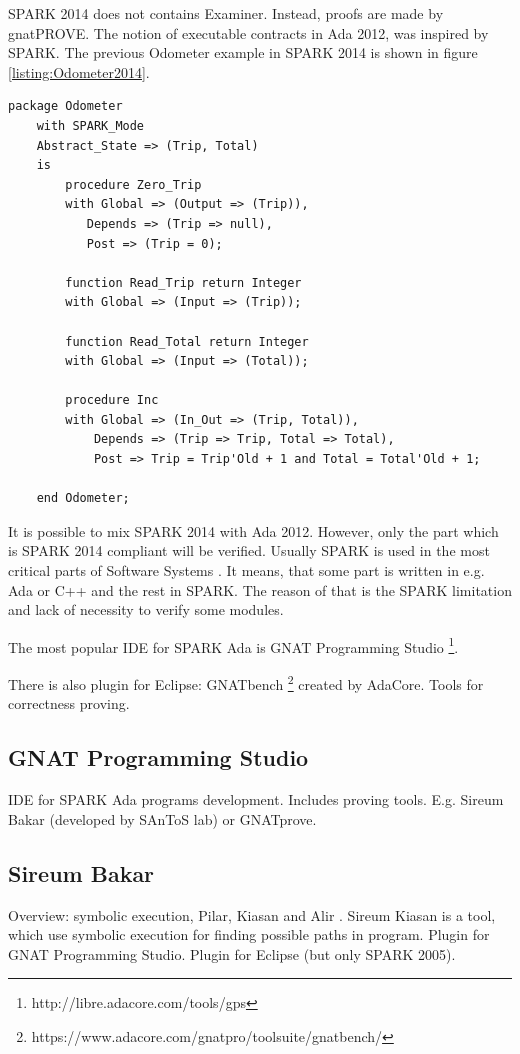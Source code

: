 SPARK 2014 does not contains Examiner. Instead, proofs are made by gnatPROVE.
The notion of executable contracts in Ada 2012, was inspired by SPARK. The previous Odometer example in SPARK 2014 is shown in figure \ref{listing:Odometer2014}.

\begin{lstlisting}[language=ada2012, frame=single, gobble=0, caption={SPARK 2014 code: Odometer}, label={listing:Odometer2014}]
	package Odometer
	with SPARK_Mode
	Abstract_State => (Trip, Total)
	is
		procedure Zero_Trip
		with Global => (Output => (Trip)),
		   Depends => (Trip => null),
		   Post => (Trip = 0);

		function Read_Trip return Integer
		with Global => (Input => (Trip));

		function Read_Total return Integer
		with Global => (Input => (Total));

		procedure Inc	   
		with Global => (In_Out => (Trip, Total)),
			Depends => (Trip => Trip, Total => Total),
			Post => Trip = Trip'Old + 1 and Total = Total'Old + 1;

	end Odometer;
\end{lstlisting} 

It is possible to mix SPARK 2014 with Ada 2012. However, only the part which is SPARK 2014 compliant will be verified. Usually SPARK is used in the most critical parts of Software Systems \cite{Spark:IndustrialExp}. It means, that some part is written in e.g. Ada or C++ and the rest in SPARK. The reason of that is the SPARK limitation and lack of necessity to verify some modules.

The most popular IDE for SPARK Ada is GNAT Programming Studio \footnote{http://libre.adacore.com/tools/gps}.

There is also plugin for Eclipse: GNATbench \footnote{https://www.adacore.com/gnatpro/toolsuite/gnatbench/} created by AdaCore. 
Tools for correctness proving.

\subsection{GNAT Programming Studio}
\label{background:spark:gps}
IDE for SPARK Ada programs development. Includes proving tools. E.g. Sireum Bakar (developed by SAnToS lab) or GNATprove.


\subsection{Sireum Bakar}
\label{background:spark:sireum}
Overview: symbolic execution, Pilar, Kiasan and Alir \cite{Hari:Thesis}.
Sireum Kiasan \cite{Kiasan:Paper} is a tool, which use symbolic execution for finding possible paths in program.
Plugin for GNAT Programming Studio.
Plugin for Eclipse (but only SPARK 2005).


